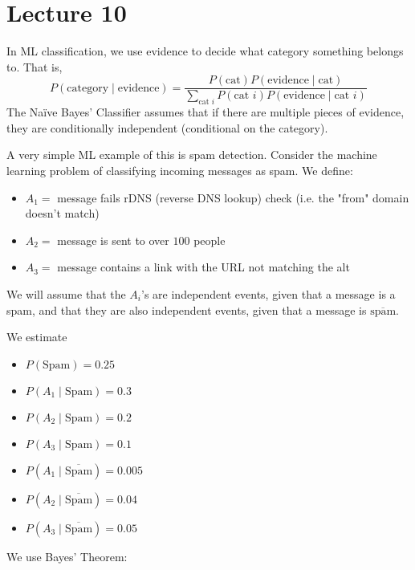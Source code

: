 \section{Lecture 10}

In ML classification, we use evidence to decide what category something
belongs to. That is,
\[ P(\text{category}\mid\text{evidence})
=\frac{P(\text{cat})P(\text{evidence}\mid\text{cat})}
{\sum\limits_{\text{cat }i} P(\text{cat }i)P(\text{evidence}\mid\text{cat }i)} \]
The Naïve Bayes' Classifier  assumes that if there are multiple pieces of evidence,
they are conditionally independent (conditional on the category).

A very simple ML example of this is spam detection. Consider the machine
learning problem of classifying incoming messages as spam. We define:
\begin{itemize}
    \item $ A_1= $ message fails rDNS (reverse DNS lookup) check (i.e. the "from" domain doesn't match)
    \item $ A_2= $ message is sent to over $ 100 $ people
    \item $ A_3= $ message contains a link with the URL not matching the alt 
\end{itemize}

We will assume that the $ A_i $'s are independent events, given that a message
is a spam, and that they are also independent events, given that a message is
$ \overline{\text{spam}} $.

We estimate
\begin{itemize}
    \item $ P(\text{Spam})=0.25 $
    \item $ P(A_1\mid \text{Spam})=0.3$
    \item $ P(A_2\mid \text{Spam})=0.2$
    \item $ P(A_3\mid \text{Spam})=0.1$
    \item $ P(A_1\mid \overline{\text{Spam}})=0.005$
    \item $ P(A_2\mid \overline{\text{Spam}})=0.04$
    \item $ P(A_3\mid \overline{\text{Spam}})=0.05$
\end{itemize}
We use Bayes' Theorem:


